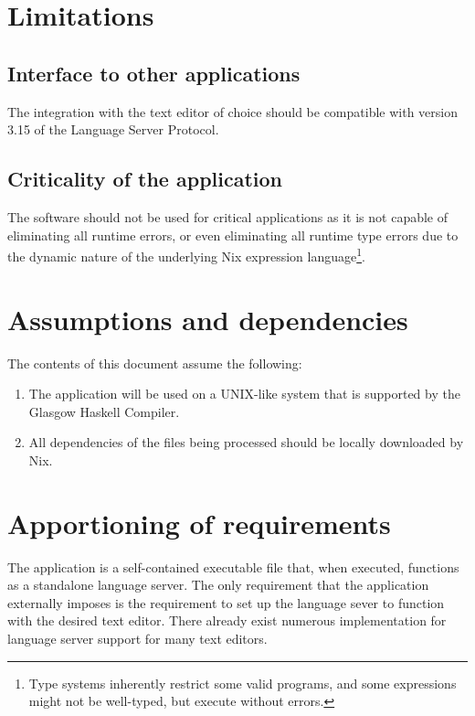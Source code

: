 \documentclass[12pt]{article}
\newcounter{req}
\begin{document}
\section{Limitations}

\subsection{Interface to other applications}

The integration with the text editor of choice should be compatible with version 3.15 of the Language Server Protocol.

\subsection{Criticality of the application}

The software should not be used for critical applications as it is not capable of eliminating all runtime errors, or even eliminating all runtime type errors due to the dynamic nature of the underlying Nix expression language\footnote{Type systems inherently restrict some valid programs, and some expressions might not be well-typed, but execute without errors.}.

\section{Assumptions and dependencies}

The contents of this document assume the following:

\begin{enumerate}
  \item The application will be used on a UNIX-like system that is supported by the Glasgow Haskell Compiler.
  \item All dependencies of the files being processed should be locally downloaded by Nix.
\end{enumerate}

\section{Apportioning of requirements}

The application is a self-contained executable file that, when executed, functions as a standalone language server. The only requirement that the application externally imposes is the requirement to set up the language sever to function with the desired text editor. There already exist numerous implementation for language server support for many text editors.
\end{document}
